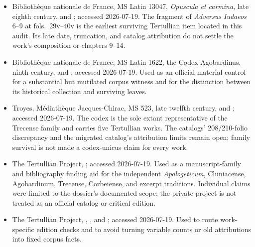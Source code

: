 \begin{itemize}
\item Biblioth\`eque nationale de France, MS Latin 13047, \emph{Opuscula et
carmina}, late eighth century,
 and
; accessed 2026-07-19. The fragment of \emph{Adversus
Iudaeos} 6--9 at fols.~29v--40v is the earliest surviving Tertullian item
located in this audit. Its late date, truncation, and catalog attribution do not
settle the work's composition or chapters 9--14.

\item Biblioth\`eque nationale de France, MS Latin 1622, the Codex Agobardinus,
ninth century,
 and
; accessed 2026-07-19. Used as an official material control for a
substantial but mutilated corpus witness and for the distinction between its
historical collection and surviving leaves.

\item Troyes, M\'ediath\`eque Jacques-Chirac, MS 523, late twelfth century,
 and
; accessed 2026-07-19. The codex is the sole extant
representative of the Trecense family and carries five Tertullian works. The
catalogs' 208/210-folio discrepancy and the migrated catalog's attribution
limits remain open; family survival is not made a codex-unicus claim for every
work.

\item The Tertullian Project,
; accessed 2026-07-19. Used as a manuscript-family and bibliography
finding aid for the independent \emph{Apologeticum}, Cluniacense, Agobardinum,
Trecense, Corbeiense, and excerpt traditions. Individual claims were limited to
the dossier's documented scope; the private project is not treated as an
official catalog or critical edition.

\item The Tertullian Project,
,
,
and ;
accessed 2026-07-19. Used to route work-specific edition checks and to avoid
turning variable counts or old attributions into fixed corpus facts.


\end{itemize}
